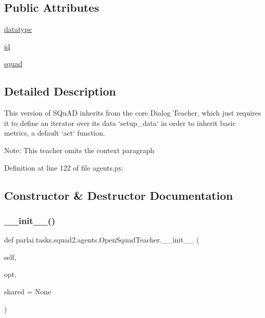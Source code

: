 \subsection*{Public Attributes}
\begin{DoxyCompactItemize}
\item 
\hyperlink{classparlai_1_1tasks_1_1squad2_1_1agents_1_1OpenSquadTeacher_ac0e68cddc67c52ee994725567a6ff45e}{datatype}
\item 
\hyperlink{classparlai_1_1tasks_1_1squad2_1_1agents_1_1OpenSquadTeacher_afee4b62658417abd64ef8bd57bbf6620}{id}
\item 
\hyperlink{classparlai_1_1tasks_1_1squad2_1_1agents_1_1OpenSquadTeacher_a80a634305ad2a0af202031e430ddf3af}{squad}
\end{DoxyCompactItemize}


\subsection{Detailed Description}
\begin{DoxyVerb}This version of SQuAD inherits from the core Dialog Teacher, which just requires it
to define an iterator over its data `setup_data` in order to inherit basic metrics,
a default `act` function.

Note: This teacher omits the context paragraph
\end{DoxyVerb}
 

Definition at line 122 of file agents.\+py.



\subsection{Constructor \& Destructor Documentation}
\mbox{\label{classparlai_1_1tasks_1_1squad2_1_1agents_1_1OpenSquadTeacher_a97032124add4cb349ff65ac04900da82}} 
\subsubsection{\texorpdfstring{\+\_\+\+\_\+init\+\_\+\+\_\+()}{\_\_init\_\_()}}
{\footnotesize\ttfamily def parlai.\+tasks.\+squad2.\+agents.\+Open\+Squad\+Teacher.\+\_\+\+\_\+init\+\_\+\+\_\+ (\begin{DoxyParamCaption}\item[{}]{self,  }\item[{}]{opt,  }\item[{}]{shared = {\ttfamily None} }\end{DoxyParamCaption})}



